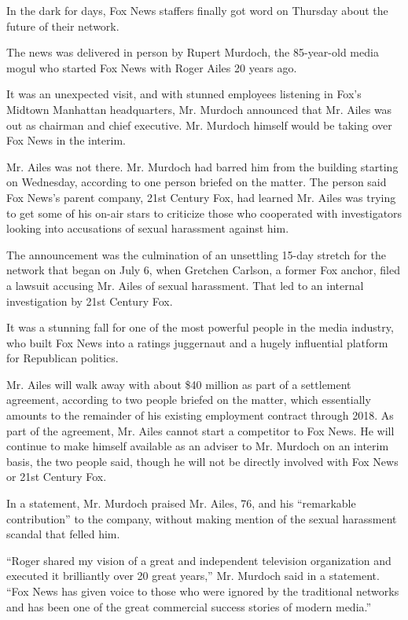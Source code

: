 In the dark for days, Fox News staffers finally got word on Thursday
about the future of their network.

The news was delivered in person by Rupert Murdoch, the 85-year-old
media mogul who started Fox News with Roger Ailes 20 years ago.

It was an unexpected visit, and with stunned employees listening in
Fox's Midtown Manhattan headquarters, Mr. Murdoch announced that Mr.
Ailes was out as chairman and chief executive. Mr. Murdoch himself would
be taking over Fox News in the interim.

Mr. Ailes was not there. Mr. Murdoch had barred him from the building
starting on Wednesday, according to one person briefed on the matter.
The person said Fox News's parent company, 21st Century Fox, had learned
Mr. Ailes was trying to get some of his on-air stars to criticize those
who cooperated with investigators looking into accusations of sexual
harassment against him.

The announcement was the culmination of an unsettling 15-day stretch for
the network that began on July 6, when Gretchen Carlson, a former Fox
anchor, filed a lawsuit accusing Mr. Ailes of sexual harassment. That
led to an internal investigation by 21st Century Fox.

It was a stunning fall for one of the most powerful people in the media
industry, who built Fox News into a ratings juggernaut and a hugely
influential platform for Republican politics.

Mr. Ailes will walk away with about \$40 million as part of a settlement
agreement, according to two people briefed on the matter, which
essentially amounts to the remainder of his existing employment contract
through 2018. As part of the agreement, Mr. Ailes cannot start a
competitor to Fox News. He will continue to make himself available as an
adviser to Mr. Murdoch on an interim basis, the two people said, though
he will not be directly involved with Fox News or 21st Century Fox.

In a statement, Mr. Murdoch praised Mr. Ailes, 76, and his ``remarkable
contribution'' to the company, without making mention of the sexual
harassment scandal that felled him.

``Roger shared my vision of a great and independent television
organization and executed it brilliantly over 20 great years,'' Mr.
Murdoch said in a statement. ``Fox News has given voice to those who
were ignored by the traditional networks and has been one of the great
commercial success stories of modern media.''


